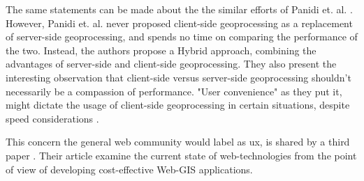 The same statements can be made about the the similar efforts of Panidi et. al. \cite{panidi_hybrid_2015}. However, Panidi et. al. never proposed client-side geoprocessing as a replacement of server-side geoprocessing, and spends no time on comparing the performance of the two. Instead, the authors propose a Hybrid approach, combining the advantages of server-side and client-side geoprocessing. They also present the interesting observation that client-side versus server-side geoprocessing shouldn't necessarily be a compassion of performance. "User convenience" as they put it, might dictate the usage of client-side geoprocessing in certain situations, despite speed considerations \cite{panidi_hybrid_2015}. 

%

This concern the general web community would label as \ac{ux}, is shared by a third paper \cite{kulawiak_analysis_2019}. Their article examine the current state of web-technologies from the point of view of developing cost-effective Web-GIS applications. 






